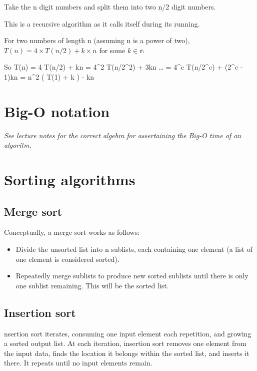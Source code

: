 Take the n digit numbers and split them into two n/2 digit numbers.

This is a recursive algorithm as it calls itself during its running.

For two numbers of length n (assuming n is a power of two), $T(n) = 4 
\times T(n/2) + k \times n$ for some $ k \in \mathbb{n}$

So T(n) = 4 T(n/2) + kn = 4\^{}2 T(n/2\^{}2) + 3kn \ldots{} = 4\^{}c
T(n/2\^{}c) + (2\^{}c - 1)kn = n\^{}2 ( T(1) + k ) - kn

\hypertarget{big-o-notation}{%
\section{Big-O notation}\label{big-o-notation}}

\emph{See lecture notes for the correct algebra for assertaining the
Big-O time of an algoritm.}

\hypertarget{sorting-algorithms}{%
\section{Sorting algorithms}\label{sorting-algorithms}}

\hypertarget{merge-sort}{%
\subsection{Merge sort}\label{merge-sort}}

Conceptually, a merge sort works as follows:

\begin{itemize}
\tightlist
\item
  Divide the unsorted list into n sublists, each containing one element
  (a list of one element is considered sorted).
\item
  Repeatedly merge sublists to produce new sorted sublists until there
  is only one sublist remaining. This will be the sorted list.
\end{itemize}

\hypertarget{insertion-sort}{%
\subsection{Insertion sort}\label{insertion-sort}}

nsertion sort iterates, consuming one input element each repetition, and
growing a sorted output list. At each iteration, insertion sort removes
one element from the input data, finds the location it belongs within
the sorted list, and inserts it there. It repeats until no input
elements remain.

